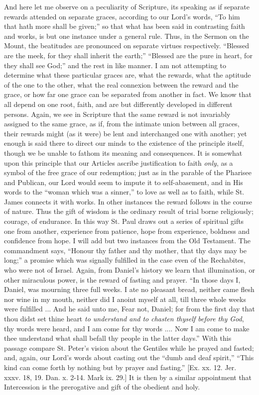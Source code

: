 And here let me observe on a peculiarity of Scripture, its speaking
as if separate rewards attended on separate graces, according to our
Lord's words, ``To him that hath more shall be given;'' so
that what has been said in contrasting faith and works, is but one
instance under a general rule. Thus, in the Sermon on the Mount, the
beatitudes are pronounced on separate virtues respectively.
``Blessed are the meek, for they shall inherit the earth;''
``Blessed are the pure in heart, for they shall see God;'' and
the rest in like manner. I am not attempting to determine what these
particular graces are, what the rewards, what the aptitude of the one
to the other, what the real connexion between the reward and the
grace, or how far one grace can be separated from another in fact. We
know that all depend on one root, faith, and are but differently
developed in different persons. Again, we see in Scripture that the
same reward is not invariably assigned to the same grace, as if, from
the intimate union between all graces, their rewards might (as it
were) be lent and interchanged one with another; yet enough is said
there to direct our minds to the existence of the principle itself,
though we be unable to fathom its meaning and consequences. It is
somewhat upon this principle that our Articles ascribe justification
to faith \emph{only}, as a symbol of the free grace of our redemption;
just as in the parable of the Pharisee and Publican, our Lord would
seem to impute it to self-abasement, and in His words to the
``woman which was a sinner,'' to love as well as to faith,
while St. James connects it with works. In other instances the reward
follows in the course of nature. Thus the gift of wisdom is the
ordinary result of trial borne religiously; courage, of endurance. In
this way St. Paul draws out a series of spiritual gifts one from
another, experience from patience, hope from experience, boldness and
confidence from hope. I will add but two instances from the Old
Testament. The commandment says, ``Honour thy father and thy
mother, that thy days may be long;'' a promise which was signally
fulfilled in the case even of the Rechabites, who were not of Israel.
Again, from Daniel's history we learn that illumination, or other
miraculous power, is the reward of fasting and prayer. ``In those
days I, Daniel, was mourning three full weeks. I ate no pleasant
bread, neither came flesh nor wine in my mouth, neither did I anoint
myself at all, till three whole weeks were fulfilled ... And he said
unto me, Fear not, Daniel; for from the first day that thou didst set
thine heart \emph{to understand and to chasten thyself before thy God},
thy words were heard, and I am come for thy words .... Now I am come
to make thee understand what shall befall thy people in the latter
days.'' With this passage compare St. Peter's vision about the
Gentiles while he prayed and fasted; and, again, our Lord's words
about casting out the ``dumb and deaf spirit,'' ``This
kind can come forth by nothing but by prayer and fasting.'' [Ex.
xx. 12. Jer. xxxv. 18, 19. Dan. x. 2-14. Mark ix. 29.] It is then by a
similar appointment that Intercession is the prerogative and gift of
the obedient and holy.


